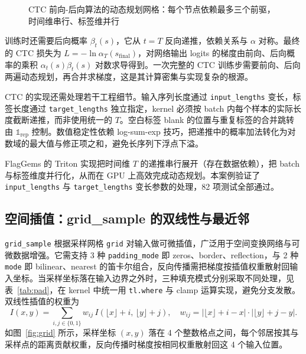 \begin{figure}[!htbp]
\centering
{}
\caption{CTC 前向-后向算法的动态规划网格：每个节点依赖最多三个前驱，时间维串行、标签维并行}
\label{fig:ctc}
\end{figure}

训练时还需要后向概率 $\beta_t(s)$，它从 $t=T$ 反向递推，依赖关系与 $\alpha$ 对称。最终的 CTC 损失为 $L = -\ln \alpha_T(s_{\text{final}})$，对网络输出 logits 的梯度由前向、后向概率的乘积 $\alpha_t(s)\beta_t(s)$ 对数求导得到。一次完整的 CTC 训练步需要前向、后向两遍动态规划，再合并求梯度，这是其计算密集与实现复杂的根源。

CTC 的实现还需处理若干工程细节。输入序列长度通过 \texttt{input\_lengths} 变长，标签长度通过 \texttt{target\_lengths} 独立指定，kernel 必须按 batch 内每个样本的实际长度截断递推，而非使用统一的 $T$。空白标签 blank 的位置与重复标签的合并跳转由 $\mathbb{1}_{\text{rep}}$ 控制。数值稳定性依赖 log-sum-exp 技巧，把递推中的概率加法转化为对数域的最大值与修正项之和，避免长序列下浮点下溢。

FlagGems 的 Triton 实现把时间维 $T$ 的递推串行展开（存在数据依赖），把 batch 与标签维度并行化，从而在 GPU 上高效完成动态规划。本案例验证了 \texttt{input\_lengths} 与 \texttt{target\_lengths} 变长参数的处理，82 项测试全部通过。

\subsection{空间插值：grid\_sample 的双线性与最近邻}
\texttt{grid\_sample} 根据采样网格 \texttt{grid} 对输入做可微插值，广泛用于空间变换网络与可微数据增强。它需支持 3 种 \texttt{padding\_mode} 即 zeros、border、reflection，与 2 种 \texttt{mode} 即 bilinear、nearest 的笛卡尔组合，反向传播需把梯度按插值权重散射回输入坐标。当采样坐标落在输入边界之外时，三种填充模式分别采取不同处理，见表~\ref{tab:pad}，在 kernel 中统一用 \texttt{tl.where} 与 clamp 运算实现，避免分支发散。双线性插值的权重为
\[
I(x,y) = \sum_{i,j \in \{0,1\}} w_{ij}\, I(\lfloor x\rfloor+i,\, \lfloor y\rfloor+j),\quad w_{ij}=|\lfloor x\rfloor+i-x|\cdot|\lfloor y\rfloor+j-y|.
\]
如图~\ref{fig:grid} 所示，采样坐标 $(x,y)$ 落在 4 个整数格点之间，每个邻居按其与采样点的距离贡献权重，反向传播时梯度按相同权重散射回这 4 个输入位置。

